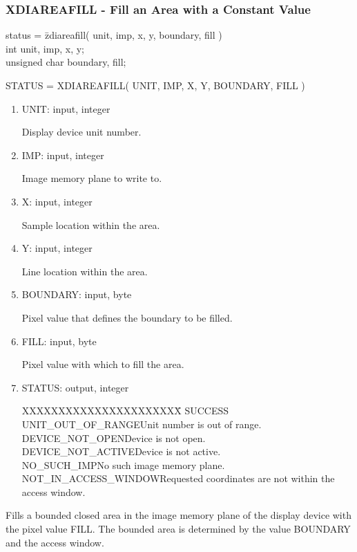 \subsubsection{XDIAREAFILL - Fill an Area with a Constant Value}
\begin{tabbing}
status = \=zdiareafill( unit, imp, x, y, boundary, fill )\\
\>int  unit, imp, x, y;\\
\>unsigned char  boundary, fill;\\
\end{tabbing}
STATUS = XDIAREAFILL( UNIT, IMP, X, Y, BOUNDARY, FILL )
\begin{enumerate}
\item UNIT:  input, integer

Display device unit number.
\item IMP:  input, integer

Image memory plane to write to.
\item X:  input, integer

Sample location within the area.
\item Y:  input, integer

Line location within the area.
\item BOUNDARY:  input, byte

Pixel value that defines the boundary to be filled.
\item FILL:  input, byte

Pixel value with which to fill the area.
\item STATUS:  output, integer
\begin{tabbing}
XXXXXXXXXXXXXXXXXXXXXX\=\kill
SUCCESS\\
UNIT\_OUT\_OF\_RANGE\>Unit number is out of range.\\
DEVICE\_NOT\_OPEN\>Device is not open.\\
DEVICE\_NOT\_ACTIVE\>Device is not active.\\
NO\_SUCH\_IMP\>No such image memory plane.\\
NOT\_IN\_ACCESS\_WINDOW\>Requested coordinates are not within the access window.\\
\end{tabbing}
\end{enumerate}
Fills a bounded closed area in the image memory plane of the display
device with the pixel value FILL.  The bounded area is determined by
the value BOUNDARY and the access window.  
\newpage
